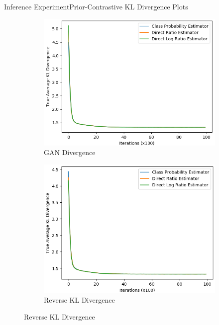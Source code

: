 \documentclass{beamer}
\begin{document}
\begin{frame}{Inference Experiment}{Prior-Contrastive KL Divergence Plots}
\begin{figure}
\begin{subfigure}{0.49\textwidth}
\includegraphics[width=\linewidth]{truklmins/PCADVvsPCADVexpvsPCADVgudlog.png}
\caption{GAN Divergence}
\end{subfigure}
\begin{subfigure}{0.49\textwidth}
\includegraphics[width=\linewidth]{truklmins/PCKLDvsPCKLexpvsPCKLgudlog.png}
\caption{Reverse KL Divergence}
\end{subfigure}
\end{figure}
\end{frame}
\end{document}
